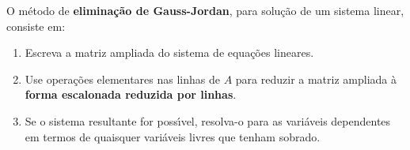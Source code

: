 \begin{definicao}
    O m\'etodo de \textbf{elimina\c{c}\~ao de Gauss-Jordan}, para solu\c{c}\~ao de um sistema linear, consiste em:
    \begin{enumerate}[label={\roman*})]
        \item Escreva a matriz ampliada do sistema de equa\c{c}\~oes lineares.

        \item Use opera\c{c}\~oes elementares nas linhas de $A$ para reduzir a matriz ampliada \`a \textbf{forma escalonada reduzida por linhas}.
        
        \item Se o sistema resultante for poss{\'\i}vel, resolva-o para as vari\'aveis dependentes em termos de quaisquer vari\'aveis livres que 
            tenham sobrado.
    \end{enumerate}
\end{definicao}
